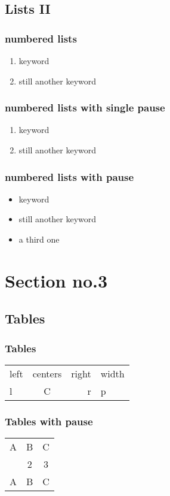\documentclass{beamer}
\begin{document}
\subsection{Lists II}
\begin{frame}
\frametitle{numbered lists}
\begin{enumerate}
\item keyword
\item still another keyword
\end{enumerate}
\end{frame}

\begin{frame}
\frametitle{numbered lists with single pause}
\begin{enumerate}
\item keyword  \pause 
\item still another keyword
\end{enumerate}
\end{frame}

\begin{frame}
\frametitle{numbered lists with pause}
\begin{itemize}[<+->]
\item keyword  
\item still another keyword
\item a third one 
\end{itemize} 
\end{frame}



\section{Section no.3} 
\subsection{Tables}
\begin{frame}
\frametitle{Tables}
\begin{tabular}{|l|c|r|p{1.5 cm }|}
\hline
left & centers & right & width \\
l & C & r & p \\
\hline
\end{tabular}
\end{frame}


\begin{frame}
\frametitle{Tables with pause}
\begin{tabular}{c c c}
A & B & C \\ 
\pause 
1 & 2 & 3 \\  
\pause 
A & B & C \\ 
\end{tabular} 
\end{frame}
\end{document}
